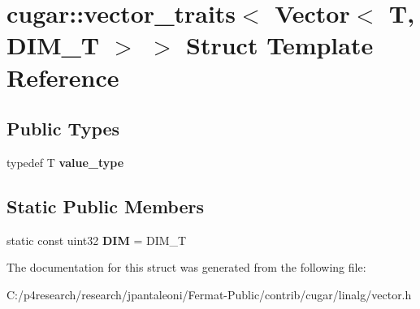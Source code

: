 \hypertarget{structcugar_1_1vector__traits_3_01_vector_3_01_t_00_01_d_i_m___t_01_4_01_4}{}\section{cugar\+:\+:vector\+\_\+traits$<$ Vector$<$ T, D\+I\+M\+\_\+T $>$ $>$ Struct Template Reference}
\label{structcugar_1_1vector__traits_3_01_vector_3_01_t_00_01_d_i_m___t_01_4_01_4}
\subsection*{Public Types}
\begin{DoxyCompactItemize}
\item 
\mbox{\label{structcugar_1_1vector__traits_3_01_vector_3_01_t_00_01_d_i_m___t_01_4_01_4_a472a21991c51b4b2ae89879cb88cdc0c}} 
typedef T {\bfseries value\+\_\+type}
\end{DoxyCompactItemize}
\subsection*{Static Public Members}
\begin{DoxyCompactItemize}
\item 
\mbox{\label{structcugar_1_1vector__traits_3_01_vector_3_01_t_00_01_d_i_m___t_01_4_01_4_ae323d6de7eee78474e3d0f04fca364cd}} 
static const uint32 {\bfseries D\+IM} = D\+I\+M\+\_\+T
\end{DoxyCompactItemize}


The documentation for this struct was generated from the following file\+:\begin{DoxyCompactItemize}
\item 
C\+:/p4research/research/jpantaleoni/\+Fermat-\/\+Public/contrib/cugar/linalg/vector.\+h\end{DoxyCompactItemize}
